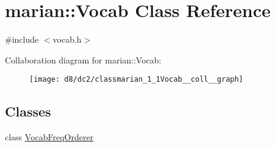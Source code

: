 \hypertarget{classmarian_1_1Vocab}{}\section{marian\+:\+:Vocab Class Reference}
\label{classmarian_1_1Vocab}


{\ttfamily \#include $<$vocab.\+h$>$}



Collaboration diagram for marian\+:\+:Vocab\+:
\nopagebreak
\begin{figure}[H]
\begin{center}
\leavevmode
\texttt{[image: d8/dc2/classmarian\_1\_1Vocab\_\_coll\_\_graph]}
\end{center}
\end{figure}
\subsection*{Classes}
\begin{DoxyCompactItemize}
\item 
class \hyperlink{classmarian_1_1Vocab_1_1VocabFreqOrderer}{Vocab\+Freq\+Orderer}
\end{DoxyCompactItemize}
